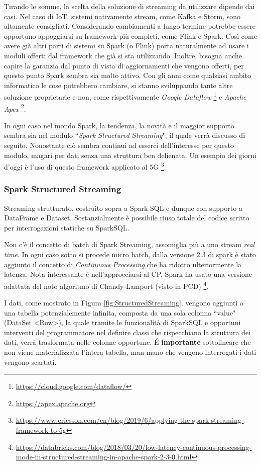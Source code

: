 \documentclass[12pt,italian]{article}
\begin{document}
Tirando le somme, la scelta della soluzione di streaming da utilizzare dipende dai casi. Nel caso di IoT, sistemi nativamente stream, come Kafka e Storm, sono altamente consigliati. Considerando cambiamenti a lungo termine potrebbe essere opportuno appoggiarsi su framework più completi, come Flink e Spark. Così come avere già altri parti di sistemi su Spark (o Flink) porta naturalmente ad usare i moduli offerti dal framework che già si sta utilizzando.
Inoltre, bisogna anche capire la garanzia dal punto di vista di aggiornamenti che vengono offerti, per questo punto Spark sembra sia molto attivo.
Con gli anni come qualsiasi ambito informatico le cose potrebbero cambiare, si stanno sviluppando tante altre soluzione proprietarie e non, come rispettivamente \textit{Google Dataflow} \footnote{\url{https://cloud.google.com/dataflow/}} e \textit{Apache Apex} \footnote{\url{https://apex.apache.org}}.

\par In ogni caso nel mondo Spark, la tendenza, la novità e il maggior supporto sembra sia nel modulo ``\textit{Spark Structured Streaming}", il quale verrà discusso di seguito.
Nonostante ciò sembra continui ad esserci dell'interesse per questo modulo, magari per dati senza una struttura ben delienata. Un esempio dei giorni d'oggi è l'uso di questo framework applicato al 5G \footnote{\url{https://www.ericsson.com/en/blog/2019/6/applying-the-spark-streaming-framework-to-5g}}.

\subsubsection{Spark Structured Streaming}\label{sec:structuredstreaming}
Streaming strutturato, costruito sopra a Spark SQL e dunque con supporto a DataFrame e Dataset. 
Sostanzialmente è possibile riuso totale del codice scritto per interrogazioni statiche su SparkSQL.
\par Non c'è il concetto di batch di Spark Streaming, assomiglia più a uno stream \textit{real time}.
In ogni caso sotto si procede micro batch, dalla versione 2.3 di spark è stato aggiunto il concetto di \textit{Continuous Processing} che ha ridotto ulteriormente la latenza.
Nota interessante è nell'approcciarsi al CP, Spark ha usato una versione adattata del noto algoritmo di Chandy-Lamport (visto in PCD) \footnote{\url{https://databricks.com/blog/2018/03/20/low-latency-continuous-processing-mode-in-structured-streaming-in-apache-spark-2-3-0.html}}.
\par I dati, come mostrato in Figura \ref{fig:StructuredStreaming}, vengono aggiunti a una tabella potenzialemente infinita, composta da una sola colonna ``value" (DataSet \textless Row\textgreater ),  la quale tramite le funzionalità di SparkSQL e opportuni interventi del programmatore nel definire classi che rispecchiano la struttura dei dati, verrà trasformata nelle colonne opportune.
É \textbf{importante} sottolineare che non viene materializzata l'intera tabella, man mano che vengono interrogati i dati vengono scartati. 
\end{document}
